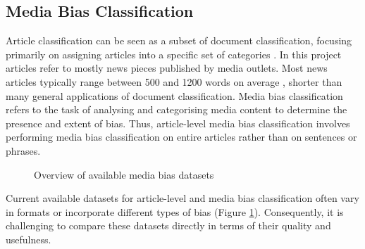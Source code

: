 \subsection{Media Bias Classification}

Article classification can be seen as a subset of document classification, focusing primarily on assigning articles into a specific set of categories \cite{dien-2019-article-classification}. In this project articles refer to mostly news pieces published by media outlets. Most news articles typically range between 500 and 1200 words on average \cite{newswhip-2013-article-length}, shorter than many general applications of document classification. Media bias classification refers to the task of analysing and categorising media content to determine the presence and extent of bias. Thus, article-level media bias classification involves performing media bias classification on entire articles rather than on sentences or phrases.

\begin{figure}[htbp]
    \centering
    \caption{Overview of available media bias datasets \cite{rodrigo-2024-systematic-review-media-bias}}
    \label{fig:media-bias-datasets-overview}
\end{figure}

Current available datasets for article-level and media bias classification often vary in formats or incorporate different types of bias \cite{rodrigo-2024-systematic-review-media-bias} (Figure \ref{fig:media-bias-datasets-overview}). Consequently, it is challenging to compare these datasets directly in terms of their quality and usefulness.

